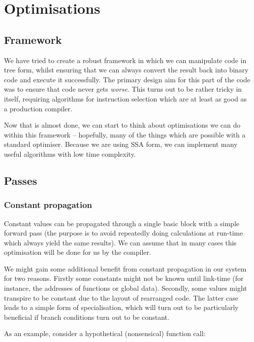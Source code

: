 \chapter{Optimisations}

\section{Framework}

We have tried to create a robust framework in which we can manipulate code in tree form, whilst ensuring that we can always convert the result back into binary code and execute it successfully. The primary design aim for this part of the code was to ensure that code never gets \emph{worse}. This turns out to be rather tricky in itself, requiring algorithms for instruction selection which are at least as good as a production compiler.

Now that is almost done, we can start to think about optimisations we can do within this framework -- hopefully, many of the things which are possible with a standard optimiser. Because we are using SSA form, we can implement many useful algorithms with low time complexity.

\section{Passes}

\subsection{Constant propagation}

Constant values can be propagated through a single basic block with a simple forward pass (the purpose is to avoid repeatedly doing calculations at run-time which always yield the same results). We can assume that in many cases this optimisation will be done for us by the compiler.

We might gain some additional benefit from constant propagation in our system for two reasons. Firstly some constants might not be known until link-time (for instance, the addresses of functions or global data). Secondly, some values might transpire to be constant due to the layout of rearranged code. The latter case leads to a simple form of specialisation, which will turn out to be particularly beneficial if branch conditions turn out to be constant.

As an example, consider a hypothetical (nonsensical) function call:

